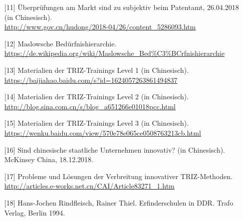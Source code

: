 \documentclass[11pt,a4paper]{article}
\begin{document}
\begin{itemize}
\item[{[11]}] Überprüfungen am Markt sind zu subjektiv beim Patentamt,
  26.04.2018 (in Chinesisch). \\
  \url{http://www.gov.cn/hudong/2018-04/26/content_5286093.htm}
\item[{[12]}] Maslowsche Bedürfnishierarchie.\\
  \url{https://de.wikipedia.org/wiki/Maslowsche_Bed%C3%BCrfnishierarchie}
\item[{[13]}] Materialien der TRIZ-Trainings Level 1 (in Chinesisch).\\
  \url{https://baijiahao.baidu.com/s?id=1624057263861494837}
\item[{[14]}] Materialien der TRIZ-Trainings Level 2 (in Chinesisch).\\
  \url{http://blog.sina.com.cn/s/blog_a651266e01018pcc.html}
\item[{[15]}] Materialien der TRIZ-Trainings Level 3 (in Chinesisch).\\
  \url{https://wenku.baidu.com/view/570e78e065ce0508763213cb.html}
\item[{[16]}] Sind chinesische staatliche Unternehmen innovativ? (in
  Chinesisch).  McKinsey China, 18.12.2018.
\item[{[17]}] Probleme und Lösungen der Verbreitung innovativer
  TRIZ-Methoden.\\ 
  \url{http://articles.e-works.net.cn/CAI/Article83271_1.htm}
\item[{[18]}] Hans-Jochen Rindfleisch, Rainer Thiel. Erfinderschulen in DDR.
  Trafo Verlag, Berlin 1994.
\end{itemize}
\end{document}
